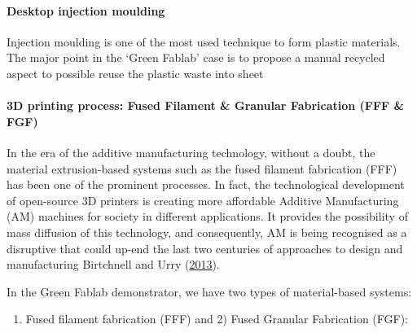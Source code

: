 \documentclass[
  11pt,
]{article}
\let\oldparagraph\paragraph
\renewcommand{\paragraph}[1]{\oldparagraph{#1}\mbox{}}
\providecommand{\tightlist}{%
  \setlength{\itemsep}{0pt}\setlength{\parskip}{0pt}}\usepackage{longtable,booktabs,array}
\let\paragraph\oldparagraph
\begin{document}
\hypertarget{desktop-injection-moulding}{%
\paragraph{Desktop injection
moulding}\label{desktop-injection-moulding}}

Injection moulding is one of the most used technique to form plastic
materials.\\
The major point in the `Green Fablab' case is to propose a manual
recycled aspect to possible reuse the plastic waste into sheet

\hypertarget{d-printing-process-fused-filament-granular-fabrication-fff-fgf}{%
\paragraph{3D printing process: Fused Filament \& Granular Fabrication
(FFF \&
FGF)}\label{d-printing-process-fused-filament-granular-fabrication-fff-fgf}}

In the era of the additive manufacturing technology, without a doubt,
the material extrusion-based systems such as the fused filament
fabrication (FFF) has been one of the prominent processes. In fact, the
technological development of open-source 3D printers is creating more
affordable Additive Manufacturing (AM) machines for society in different
applications. It provides the possibility of mass diffusion of this
technology, and consequently, AM is being recognised as a disruptive
that could up-end the last two centuries of approaches to design and
manufacturing Birtchnell and Urry
(\protect\hyperlink{ref-Birtchnell2013a}{2013}).

In the Green Fablab demonstrator, we have two types of material-based
systems:

\begin{enumerate}
\def\labelenumi{\arabic{enumi})}
\tightlist
\item
  Fused filament fabrication (FFF) and 2) Fused Granular Fabrication
  (FGF):
\end{enumerate}
\end{document}
